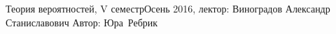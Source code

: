 


\BigHeader
    {Теория вероятностей, V семестр}{Осень 2016, лектор: Виноградов Александр Станиславович}
    {Автор: Юра~Ребрик}
\gdef\LectureName{Теор. вер-тей, V семестр}


